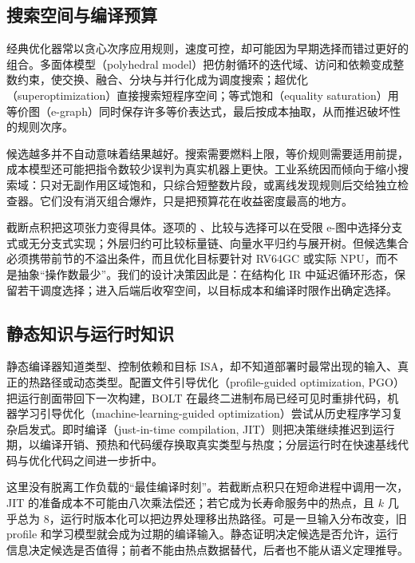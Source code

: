 \subsection{搜索空间与编译预算}

经典优化器常以贪心次序应用规则，速度可控，却可能因为早期选择而错过更好的组合。多面体模型（polyhedral model）把仿射循环的迭代域、访问和依赖变成整数约束，使交换、融合、分块与并行化成为调度搜索\cite{adv-pluto,adv-polly}；超优化（superoptimization）直接搜索短程序空间\cite{adv-stoke,adv-souper}；等式饱和（equality saturation）用等价图（e-graph）同时保存许多等价表达式，最后按成本抽取，从而推迟破坏性的规则次序\cite{adv-egg,adv-cranelift-egraph}。

候选越多并不自动意味着结果越好。搜索需要燃料上限，等价规则需要适用前提，成本模型还可能把指令数较少误判为真实机器上更快。工业系统因而倾向于缩小搜索域：只对无副作用区域饱和，只综合短整数片段，或离线发现规则后交给独立检查器。它们没有消灭组合爆炸，只是把预算花在收益密度最高的地方。

截断点积把这项张力变得具体。逐项的 、比较与选择可以在受限 e-图中选择分支式或无分支式实现；外层归约可比较标量链、向量水平归约与展开树。但候选集合必须携带前节的不溢出条件，而且优化目标要针对 RV64GC 或实际 NPU，而不是抽象“操作数最少”。我们的设计决策因此是：在结构化 IR 中延迟循环形态，保留若干调度选择；进入后端后收窄空间，以目标成本和编译时限作出确定选择。

\subsection{静态知识与运行时知识}

静态编译器知道类型、控制依赖和目标 ISA，却不知道部署时最常出现的输入、真正的热路径或动态类型。配置文件引导优化（profile-guided optimization, PGO）把运行剖面带回下一次构建，BOLT 在最终二进制布局已经可见时重排代码，机器学习引导优化（machine-learning-guided optimization）尝试从历史程序学习复杂启发式\cite{adv-clang-pgo,adv-autofdo,adv-bolt,adv-mlgo-paper,adv-mlgo-doc}。即时编译（just-in-time compilation, JIT）则把决策继续推迟到运行期，以编译开销、预热和代码缓存换取真实类型与热度；分层运行时在快速基线代码与优化代码之间进一步折中\cite{adv-art-jit,adv-orc}。

这里没有脱离工作负载的“最佳编译时刻”。若截断点积只在短命进程中调用一次，JIT 的准备成本不可能由八次乘法偿还；若它成为长寿命服务中的热点，且 $k$ 几乎总为 $8$，运行时版本化可以把边界处理移出热路径。可是一旦输入分布改变，旧 profile 和学习模型就会成为过期的编译输入。静态证明决定候选是否允许，运行信息决定候选是否值得；前者不能由热点数据替代，后者也不能从语义定理推导。

